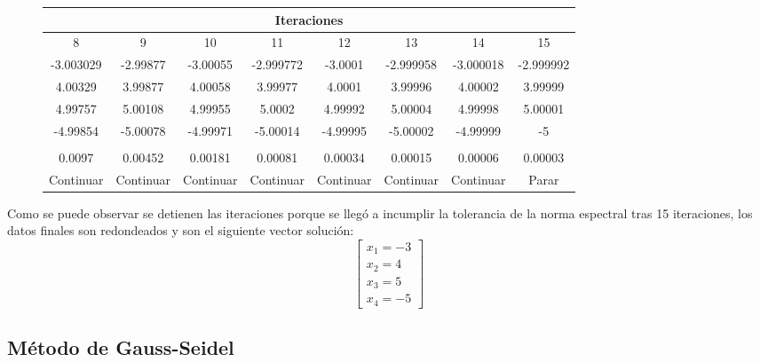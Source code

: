 \documentclass{article}
\begin{document}
\begin{figure}[h]
   \centering
   \begin{adjustwidth}{-2cm}{0cm}
       \begin{tabular}{| c | c | c | c | c | c | c | c |}
           \hline
           \multicolumn{8}{|c|}{Iteraciones} \\
           \hline
           8   &   9   &   10  &   11  &   12  &   13  &   14  &   15   \\ \hline
           -3.003029   &   -2.99877    &   -3.00055    &   -2.999772   &   -3.0001 &   -2.999958   &   -3.000018   &   -2.999992   \\
           4.00329 &   3.99877 &   4.00058 &   3.99977 &   4.0001  &   3.99996 &   4.00002 &   3.99999 \\
           4.99757 &   5.00108 &   4.99955 &   5.0002  &   4.99992 &   5.00004 &   4.99998 &   5.00001 \\
           -4.99854    &   -5.00078    &   -4.99971    &   -5.00014    &   -4.99995    &   -5.00002    &   -4.99999    &   -5  \\
               &       &       &       &       &       &       &       \\ \hline
           0.0097  &   0.00452 &   0.00181 &   0.00081 &   0.00034 &   0.00015 &   0.00006 &   0.00003 \\ \hline
           Continuar   &   Continuar   &   Continuar   &   Continuar   &   Continuar   &   Continuar   &   Continuar   &   Parar   \\ \hline
       \end{tabular}
   \end{adjustwidth}
\end{figure}


Como se puede observar se detienen las iteraciones porque se llegó a incumplir la tolerancia de la norma espectral tras 15 iteraciones, los datos finales
son redondeados y son el siguiente vector solución:
\begin{equation*}
   \begin{bmatrix}
       x_1 = -3 \\
       x_2 = 4 \\
       x_3 = 5 \\
       x_4 = -5
   \end{bmatrix}
\end{equation*}


\subsection{Método de Gauss-Seidel}
\end{document}
